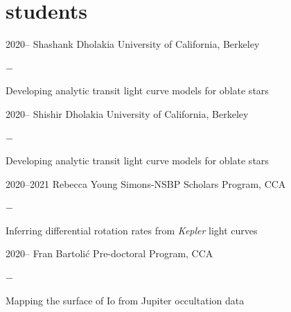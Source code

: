 \documentclass[]{luger-cv} %
\begin{document}


\ifdefined \withother

    \section{students}
    \begin{entrylist}


        \entry
        {2020--}
        {Shashank Dholakia}
        {University of California, Berkeley}
        {%
            \vspace{-1em}
            \begin{list}{{\color{numcolor}$-$}}{\cvlist}
                \item Developing analytic transit light curve models for oblate stars
            \end{list}
        }


        \entry
        {2020--}
        {Shishir Dholakia}
        {University of California, Berkeley}
        {%
            \vspace{-1em}
            \begin{list}{{\color{numcolor}$-$}}{\cvlist}
                \item Developing analytic transit light curve models for oblate stars
            \end{list}
        }


        \entry
        {2020--2021}
        {Rebecca Young}
        {Simons-NSBP Scholars Program, CCA}
        {%
            \vspace{-1em}
            \begin{list}{{\color{numcolor}$-$}}{\cvlist}
                \item Inferring differential rotation rates from \emph{Kepler} light curves
            \end{list}
        }


        \entry
        {2020--}
        {Fran Bartoli\'c}
        {Pre-doctoral Program, CCA}
        {%
            \vspace{-1em}
            \begin{list}{{\color{numcolor}$-$}}{\cvlist}
                \item Mapping the surface of Io from Jupiter occultation data
            \end{list}
        }


\end{entrylist}
\end{document}
